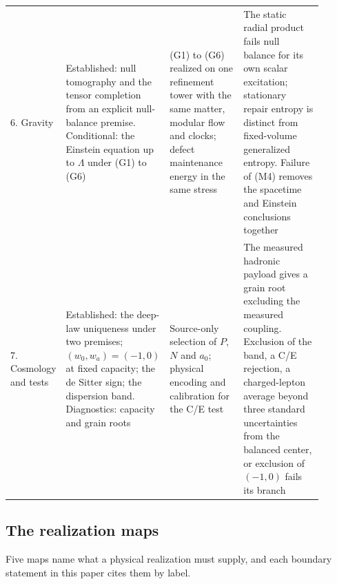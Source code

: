 \documentclass[11pt]{article}
\theoremstyle{definition}
\theoremstyle{remark}
\begin{document}
{\begin{longtable}{@{}L{0.13\linewidth}L{0.27\linewidth}L{0.24\linewidth}L{0.26\linewidth}@{}}
6. Gravity & Established: null tomography and the tensor completion from an
explicit null-balance premise. Conditional: the Einstein equation up to
$\Lambda$ under (G1) to (G6) & (G1) to (G6) realized on one refinement
tower with the same matter, modular flow and clocks; defect maintenance
energy in the same stress & The static radial product fails null balance
for its own scalar excitation; stationary repair entropy is distinct from
fixed-volume generalized entropy. Failure of (M4) removes the spacetime and
Einstein conclusions together\\
7. Cosmology and tests & Established: the deep-law uniqueness under two
premises; $(w_0,w_a)=(-1,0)$ at fixed capacity; the de Sitter sign; the
dispersion band. Diagnostics: capacity and grain roots & Source-only
selection of $P$, $N$ and $a_0$; physical encoding and calibration for the
C/E test & The measured hadronic payload gives a grain root excluding the
measured coupling. Exclusion of the band, a C/E rejection, a charged-lepton
average beyond three standard uncertainties from the balanced center, or
exclusion of $(-1,0)$ fails its branch\\*
\bottomrule
\end{longtable}
}

\subsection{The realization maps}
\label{sec:standing-maps}

Five maps name what a physical realization must supply, and each boundary
statement in this paper cites them by label.
\end{document}
